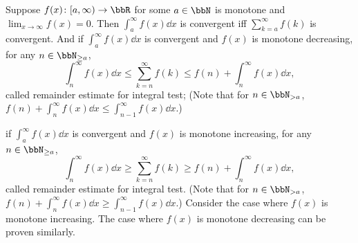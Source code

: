 Suppose $f(x)\colon[a,\infty)\to\bbR$ for some $a\in\bbN$ is monotone and $\lim_{x\to\infty}f(x)=0$. Then $\int_a^{\infty}f(x)\dd{x}$ is convergent iff $\sum_{k=a}^{\infty}f(k)$ is convergent. And if $\int_a^{\infty}f(x)\dd{x}$ is convergent and $f(x)$ is monotone decreasing, for any $n\in\bbN_{\ge a}$,
\[\int_n^{\infty}f(x)\dd{x}\le\sum_{k=n}^{\infty}f(k)\le f(n)+\int_n^{\infty}f(x)\dd{x},\]
called remainder estimate for integral test; (Note that for $n\in\bbN_{>a}$, $f(n)+\int_n^{\infty}f(x)\dd{x}\le\int_{n-1}^{\infty}f(x)\dd{x}$.)

if $\int_a^{\infty}f(x)\dd{x}$ is convergent and $f(x)$ is monotone increasing, for any $n\in\bbN_{\ge a}$,
\[\int_n^{\infty}f(x)\dd{x}\ge\sum_{k=n}^{\infty}f(k)\ge f(n)+\int_n^{\infty}f(x)\dd{x},\]
called remainder estimate for integral test. (Note that for $n\in\bbN_{>a}$, $f(n)+\int_n^{\infty}f(x)\dd{x}\ge\int_{n-1}^{\infty}f(x)\dd{x}$.)
\bpr
Consider the case where $f(x)$ is monotone increasing. The case where $f(x)$ is monotone decreasing can be proven similarly.

